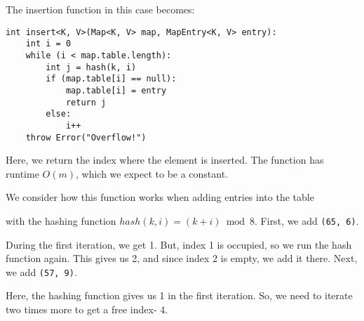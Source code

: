 \documentclass[a4paper, openany]{memoir}
\begin{document}
\noindent The insertion function in this case becomes:
\begin{lstlisting}[language=pseudocode]
int insert<K, V>(Map<K, V> map, MapEntry<K, V> entry):
    int i = 0
    while (i < map.table.length):
        int j = hash(k, i)
        if (map.table[i] == null):
            map.table[i] = entry
            return j
        else:
            i++
    throw Error("Overflow!")
\end{lstlisting}
Here, we return the index where the element is inserted. The function has runtime $O(m)$, which we expect to be a constant.

\noindent We consider how this function works when adding entries into the table
\begin{center}
\end{center}
with the hashing function $hash(k, i) = (k + i) \bmod{8}$. First, we add \texttt{(65, 6)}.
\begin{center}
\end{center}
During the first iteration, we get 1. But, index 1 is occupied, so we run the hash function again. This gives us 2, and since index 2 is empty, we add it there. Next, we add \texttt{(57, 9)}.
\begin{center}
\end{center}
Here, the hashing function gives us 1 in the first iteration. So, we need to iterate two times more to get a free index- 4.
\end{document}
